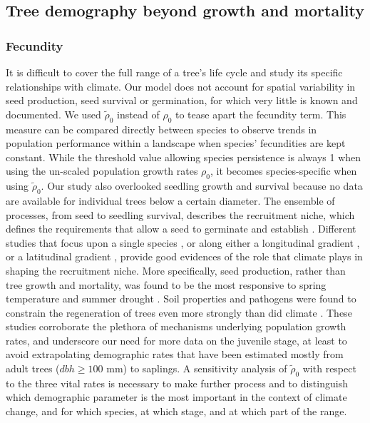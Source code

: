 \subsection{Tree demography beyond growth and mortality}
\subsubsection{Fecundity}
It is difficult to cover the full range of a tree's life cycle and study its specific relationships with climate. Our model does not account for spatial variability in seed production, seed survival or germination, for which very little is known and documented. We used $ \tilde \rho_0 $ instead of $ \rho_0 $ to tease apart the fecundity term. This measure can be compared directly between species to observe trends in population performance within a landscape when species' fecundities are kept constant. While the threshold value allowing species persistence is always 1 when using the un-scaled population growth rates $ \rho_0 $, it becomes species-specific when using $ \tilde \rho_0 $. Our study also overlooked seedling growth and survival because no data are available for individual trees below a certain diameter. The ensemble of processes, from seed to seedling survival, describes the recruitment niche, which defines the requirements that allow a seed to germinate and establish \citep{Valdez2019}. Different studies that focus upon a single species \citep[\textit{Acer saccharum}]{Solarik2016}, or along either a longitudinal gradient \citep{CLARK2011}, or a latitudinal gradient \citep{Boisvert-Marsh2019}, provide good evidences of the role that climate plays in shaping the recruitment niche. More specifically, seed production, rather than tree growth and mortality, was found to be the most responsive to spring temperature and summer drought \citep[11 sites in the Appalachians and Piedmont of North Carolina]{CLARK2011}. Soil properties and pathogens were found to constrain the regeneration of trees even more strongly than did climate \citep[Mont M\'{e}gantic, Qu\'{e}bec]{Brown2014}. These studies corroborate the plethora of mechanisms underlying population growth rates, and underscore our need for more data on the juvenile stage, at least to avoid extrapolating demographic rates that have been estimated mostly from adult trees ($ dbh \geqslant 100 $ mm) to saplings. A sensitivity analysis of $ \tilde \rho_0 $ with respect to the three vital rates is necessary to make further process and to distinguish which demographic parameter is the most important in the context of climate change, and for which species, at which stage, and at which part of the range.

